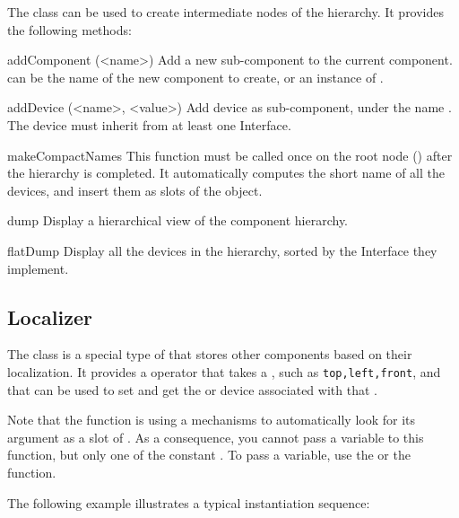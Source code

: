 The  class can be used to create intermediate nodes of the
hierarchy. It provides the following methods:

\begin{urbiscriptapi}

\item[addComponent](<name>)%
  Add a new sub-component to the current component.  can
  be the name of the new component to create, or an instance of
  .

\item[addDevice](<name>, <value>)%
  Add device  as sub-component, under the name . The
  device must inherit from at least one Interface.

\item[makeCompactNames]%
  This function must be called once on the root node () after
  the hierarchy is completed.  It automatically computes the short name of
  all the devices, and insert them as slots of the  object.

\item[dump]%
  Display a hierarchical view of the component hierarchy.

\item[flatDump]%
  Display all the devices in the hierarchy, sorted by the Interface
  they implement.
\end{urbiscriptapi}

\subsection{Localizer}

The  class is a special type of  that stores
other components based on their localization. It provides a \code{[]} operator
that takes a , such as \lstinline|top,left,front|, and that
can be used to set and get the  or device associated with
that .

Note that the \code{[]} function is using a mechanisms to automatically look
for its argument as a slot of . As a consequence, you cannot
pass a variable to this function, but only one of the constant
.
To pass a variable, use the  or the 
function.

The following example illustrates a typical instantiation sequence:

